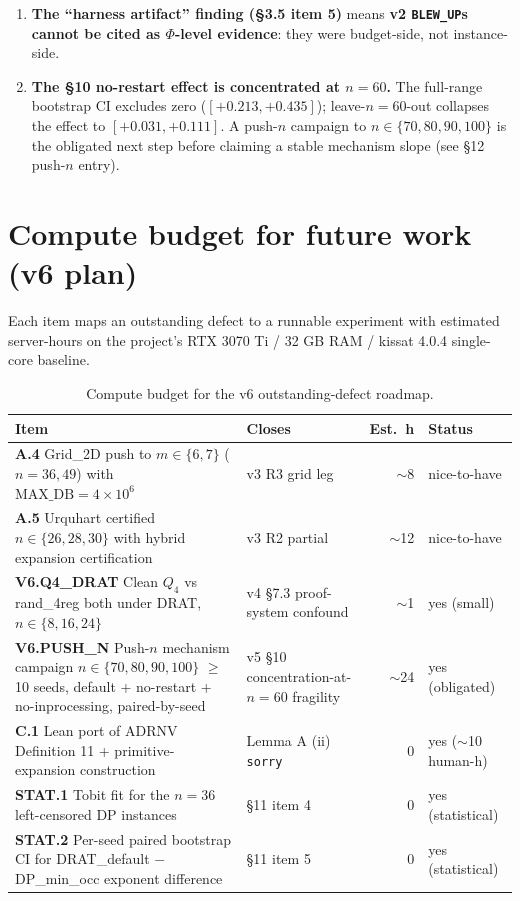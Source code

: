 \documentclass[11pt,a4paper]{article}
\theoremstyle{remark}
\begin{document}
{\begin{enumerate}
\item \textbf{The ``harness artifact'' finding (\S3.5 item 5)} means
\textbf{v2 \texttt{BLEW\_UP}s cannot be cited as $\Phi$-level evidence}:
they were budget-side, not instance-side.

\item \textbf{The \S10 no-restart effect is concentrated at $n=60$.} The
full-range bootstrap CI excludes zero ($[+0.213, +0.435]$);
leave-$n=60$-out collapses the effect to $[+0.031, +0.111]$. A push-$n$
campaign to $n \in \{70, 80, 90, 100\}$ is the obligated next step before
claiming a stable mechanism slope (see \S12 push-$n$ entry).
\end{enumerate}

\section{Compute budget for future work (v6 plan)}

Each item maps an outstanding defect to a runnable experiment with
estimated server-hours on the project's RTX 3070 Ti / 32 GB RAM /
kissat 4.0.4 single-core baseline.

\begin{table}[H]
\centering
\small
\renewcommand{\arraystretch}{1.1}
\begin{tabularx}{\textwidth}{@{}>{\raggedright\arraybackslash}X
                              >{\raggedright\arraybackslash}X
                              r
                              >{\raggedright\arraybackslash}p{2.0cm}@{}}
\toprule
Item & Closes & Est.\ h & Status \\
\midrule
\textbf{A.4} Grid\_2D push to $m \in \{6, 7\}$ ($n = 36, 49$) with
$\mathrm{MAX\_DB} = 4 \times 10^6$ & v3 R3 grid leg & $\sim$8 &
nice-to-have \\
\textbf{A.5} Urquhart certified $n \in \{26, 28, 30\}$ with hybrid
expansion certification & v3 R2 partial & $\sim$12 & nice-to-have \\
\textbf{V6.Q4\_DRAT} Clean $Q_4$ vs rand\_4reg both under DRAT, $n \in
\{8, 16, 24\}$ & v4 \S7.3 proof-system confound & $\sim$1 & yes (small) \\
\textbf{V6.PUSH\_N} Push-$n$ mechanism campaign $n \in \{70, 80, 90,
100\}$ $\ge$10 seeds, default + no-restart + no-inprocessing, paired-by-seed
& v5 \S10 concentration-at-$n=60$ fragility & $\sim$24 & yes (obligated) \\
\textbf{C.1} Lean port of ADRNV Definition 11 + primitive-expansion
construction & Lemma A (ii) \texttt{sorry} & 0 & yes ($\sim$10 human-h) \\
\textbf{STAT.1} Tobit fit for the $n=36$ left-censored DP instances &
\S11 item 4 & 0 & yes (statistical) \\
\textbf{STAT.2} Per-seed paired bootstrap CI for DRAT\_default $-$
DP\_min\_occ exponent difference & \S11 item 5 & 0 & yes (statistical) \\
\bottomrule
\end{tabularx}
\caption{Compute budget for the v6 outstanding-defect roadmap.}
\label{tab:v6-budget}
\end{table}

}
\end{document}
